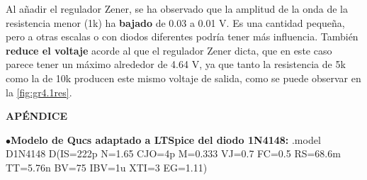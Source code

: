 \documentclass[]{scrartcl}
\begin{document}
Al añadir el regulador Zener, se ha observado que la amplitud de la onda de la resistencia menor (1k) ha \textbf{bajado} de 0.03 a 0.01 V. Es una cantidad pequeña, pero a otras escalas o con diodos diferentes podría tener más influencia. También \textbf{reduce el voltaje} acorde al que el regulador Zener dicta, que en este caso parece tener un máximo alrededor de 4.64 V, ya que tanto la resistencia de 5k como la de 10k producen este mismo voltaje de salida, como se puede observar en la \cref{fig:gr4.1res}.



\appendix
\textbf{APÉNDICE} \label{app:appendix}

$\bullet$\textbf{Modelo de Qucs adaptado a LTSpice del diodo 1N4148:} 
.model D1N4148 D(IS=222p N=1.65 CJO=4p M=0.333 VJ=0.7 FC=0.5 RS=68.6m TT=5.76n BV=75 IBV=1u XTI=3 EG=1.11)

\clearpage


\end{document}

